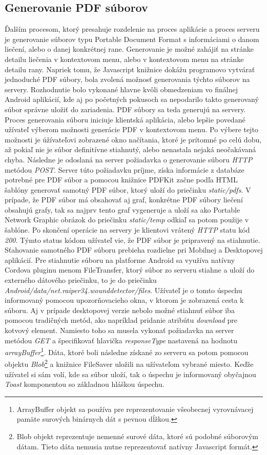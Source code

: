 \subsection{Generovanie PDF súborov}
Ďalším procesom, ktorý presahuje rozdelenie na proces aplikácie a proces serveru je generovanie súborov typu Portable Document Format s informáciami o danom liečení, alebo o danej konkrétnej rane. Generovanie je možné zahájiť na stránke detailu liečenia v kontextovom menu, alebo v kontextovom  menu na stránke detailu rany. Napriek tomu, že Javascript knižnice dokážu programovo vytvárať jednoduché PDF súbory, bola zvolená možnosť generovania týchto súborov na servery. Rozhodnutie bolo vykonané hlavne kvôli obmedzeniam vo finálnej Android aplikácií, kde aj po početných pokusoch sa nepodarilo takto generovaný súbor správne uložiť do zariadenia. PDF súbory sa teda generujú na servery. Proces generovania súboru iniciuje klientská aplikácia, alebo lepšie povedané užívateľ výberom možnosti generácie PDF v kontextovom menu. Po výbere tejto možnosti je úžívateľovi zobrazené okno načítania, ktoré je prítomné po celú dobu, až pokiaľ nie je súbor definitívne stiahnutý, alebo nenastala nejaká neočakávaná chyba. Následne je odoslaná na server požiadavka o generovanie súboru \textit{HTTP} metódou \textit{POST}. Server túto požiadavku príjme, získa informácie z databáze potrebné pre PDF súbor a pomocou knižnice PDFKit začne podľa HTML šablóny generovať samotný PDF súbor, ktorý uloží do priečinku \textit{static/pdfs}. V prípade, že PDF súbor má obsahovať aj graf, konkrétne PDF súbory liečení obsahujú grafy, tak sa najprv tento graf vygeneruje a uloží sa ako Portable Network Graphic obrázok do priečinku \textit{static/temp} odkiaľ sa potom použije v šablóne.  Po skončení operácie na servery je klientovi vrátený \textit{HTTP} statu kód \textit{200}. Týmto status kódom užívateľ vie, že PDF súbor je pripravený na stiahnutie. Sťahovanie samotného PDF súboru prebieha rozdielne pri Mobilnej a Desktopovej aplikácií. Pre stiahnutie súboru na platforme Android sa využíva natívny Cordova pluginu menom FileTransfer, ktorý súbor zo serveru stiahne a uloží do externého dátového priečinku, to je do priečinku \textit{Android/data/net.raiper34.wounddetector/files}. Užívateľ je o tomto úspechu informovaný pomocou upozorňovacieho okna, v ktorom je zobrazená cesta k súboru. Aj v prípade  desktopovej verzie nebolo možné stiahnuť súbor iba pomocou tradičných metód, ako napríklad pridanie atribútu \textit{download} pre kotvový element. Namiesto toho sa musela vykonať požiadavka na server metódou \textit{GET} a špecifikovať hlavička \textit{responseType} nastavená na hodnotu \textit{arrayBuffer}\footnote{ArrayBuffer objekt sa používa pre reprezentovanie všeobecnej vyrovnávacej pamäte surových binárnych dát s pevnou dĺžkou.\cite{lkToNI4tHykidWsV}}. Dáta, ktoré boli následne získané zo serveru sa potom pomocou  objektu \textit{Blob}\footnote{Blob objekt reprezentuje nemenné surové dáta, ktoré sú podobné súborovým dátam. Tieto dáta nemusia nutne reprezentovať natívny Javascript formát.\cite{m3Dxu36mfpc2MCxI}} a knižnice FileSaver uložili na užívateľom vybrané miesto. Keďže užívatel si sám volí, kde sa súbor uloží, tak o úspechu je informovaný obyčajnou \textit{Toast} komponentou so základnou hláškou úspechu.

